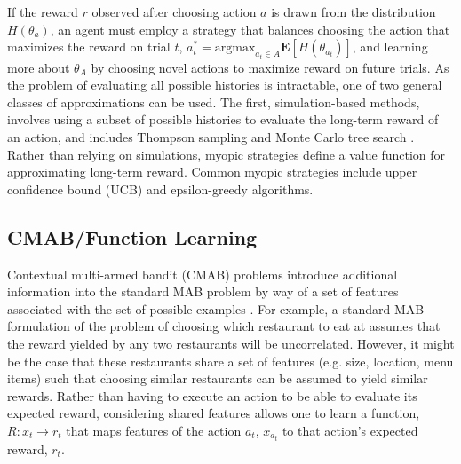 \documentclass[10pt,letterpaper]{article}
\begin{document}
	If the reward $r$ observed after choosing action $a$ is drawn from the distribution $H(\theta_{a})$, an agent must employ a strategy that balances choosing the action that maximizes the reward on trial $t$, $a_{t}^{*} = \text{argmax}_{a_{t} \in A} \mathbf{E}[H(\theta_{a_{t}})]$, and learning more about $\theta_{A}$ by choosing novel actions to maximize reward on future trials. As the problem of evaluating all possible histories is intractable, one of two general classes of approximations can be used. The first, simulation-based methods, involves using a subset of possible histories to evaluate the long-term reward of an action, and includes Thompson sampling \citep{Thompson} and Monte Carlo tree search \citep{Coulom2007}. Rather than relying on simulations, myopic strategies define a value function for approximating long-term reward. Common myopic strategies include upper confidence bound (UCB) \citep{Agrawal} and epsilon-greedy \citep{Sutton1998a} algorithms.
	
	\subsection{CMAB/Function Learning}
	
	Contextual multi-armed bandit (CMAB) problems introduce additional information into the standard MAB problem by way of a set of features associated with the set of possible examples \citep{Langford}. For example, a standard MAB formulation of the problem of choosing which restaurant to eat at assumes that the reward yielded by any two restaurants will be uncorrelated. However, it might be the case that these restaurants share a set of features (e.g. size, location, menu items) such that choosing similar restaurants can be assumed to yield similar rewards. Rather than having to execute an action to be able to evaluate its expected reward, considering shared features allows one to learn a function, $R: x_{t} \to r_{t}$ that maps features of the action $a_{t}$, $x_{a_{t}}$ to that action's expected reward, $r_{t}$.
	
\end{document}
